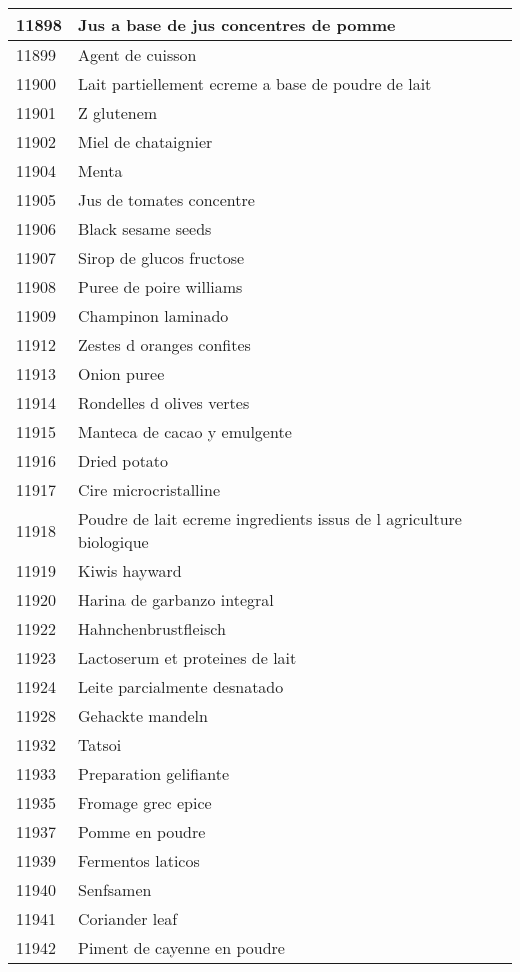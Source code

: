 \begin{longtable}{|l|l|}
11898 & Jus a base de jus concentres de pomme \\ \hline 
11899 & Agent de cuisson \\ \hline 
11900 & Lait partiellement ecreme a base de poudre de lait \\ \hline 
11901 & Z glutenem \\ \hline 
11902 & Miel de chataignier \\ \hline 
11904 & Menta \\ \hline 
11905 & Jus de tomates concentre \\ \hline 
11906 & Black sesame seeds \\ \hline 
11907 & Sirop de glucos fructose \\ \hline 
11908 & Puree de poire williams \\ \hline 
11909 & Champinon laminado \\ \hline 
11912 & Zestes d oranges confites \\ \hline 
11913 & Onion puree \\ \hline 
11914 & Rondelles d olives vertes \\ \hline 
11915 & Manteca de cacao y emulgente \\ \hline 
11916 & Dried potato \\ \hline 
11917 & Cire microcristalline \\ \hline 
11918 & Poudre de lait ecreme  ingredients issus de l agriculture biologique \\ \hline 
11919 & Kiwis hayward \\ \hline 
11920 & Harina de garbanzo integral \\ \hline 
11922 & Hahnchenbrustfleisch \\ \hline 
11923 & Lactoserum et proteines de lait \\ \hline 
11924 & Leite parcialmente desnatado \\ \hline 
11928 & Gehackte mandeln \\ \hline 
11932 & Tatsoi \\ \hline 
11933 & Preparation gelifiante \\ \hline 
11935 & Fromage grec epice \\ \hline 
11937 & Pomme en poudre \\ \hline 
11939 & Fermentos laticos \\ \hline 
11940 & Senfsamen \\ \hline 
11941 & Coriander leaf \\ \hline 
11942 & Piment de cayenne en poudre \\ \hline 

\end{longtable}
